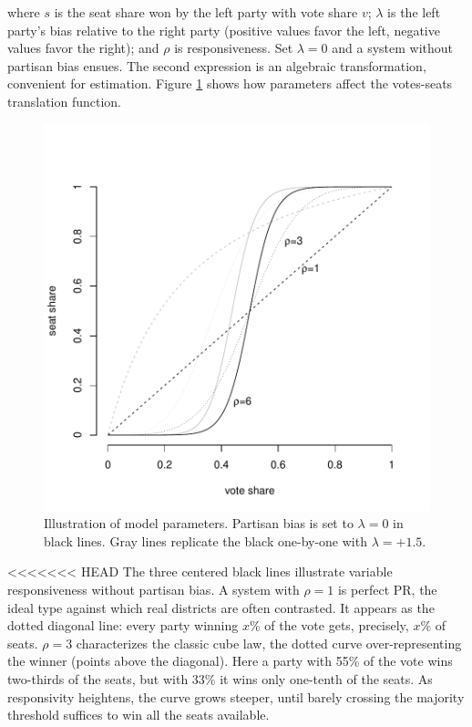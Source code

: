 \documentclass[letter,12pt]{article}
\begin{document}
\noindent where $s$ is the seat share won by the left party with vote share $v$; $\lambda$ is the left party's bias relative to the right party (positive values favor the left, negative values favor the right); and $\rho$ is responsiveness. Set $\lambda=0$ and a system without partisan bias ensues. The second expression is an algebraic transformation,  convenient for estimation. Figure \ref{F:lambdaRhoEx} shows how parameters affect the votes-seats translation function. 


\begin{figure}
\begin{center}
    \includegraphics[width=.55\columnwidth]{rhoExample.pdf} 
\caption{Illustration of model parameters. Partisan bias is set to $\lambda=0$ in black lines. Gray lines replicate the black one-by-one with $\lambda=+1.5$.}\label{F:lambdaRhoEx}
\end{center}
\end{figure}

<<<<<<< HEAD
The three centered black lines illustrate variable responsiveness without partisan bias. A system with $\rho=1$ is perfect PR, the ideal type against which real districts are often contrasted. It appears as the dotted diagonal line: every party winning $x$\% of the vote gets, precisely, $x$\% of seats. $\rho=3$ characterizes the classic cube law, the dotted curve over-representing the winner (points above the diagonal). Here a party with 55\% of the vote wins two-thirds of the seats, but with 33\% it wins only one-tenth of the seats. As responsivity heightens, the curve grows steeper, until barely crossing the majority threshold suffices to win all the seats available. 
\end{document}
